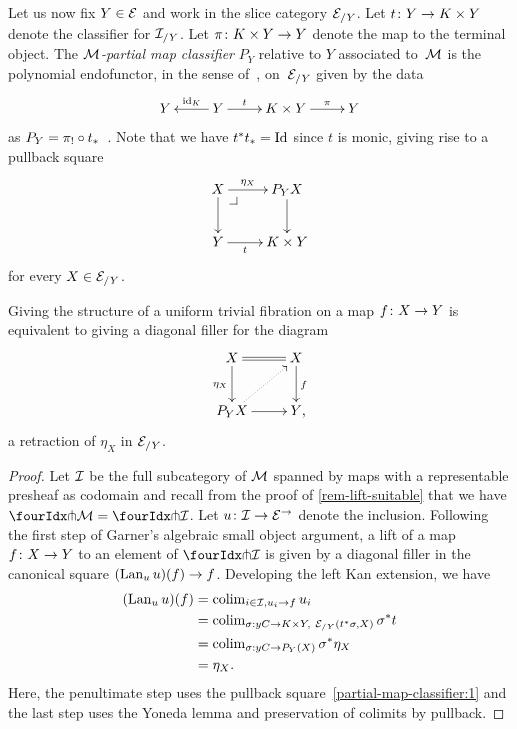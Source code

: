 \documentclass[reqno,10pt,a4paper,oneside,draft]{amsart}
\begin{document}
{{Let us now fix $Y \in \cal{E}$ and work in the slice category $\cal{E}_{/Y}$.
Let $t \co Y \to K \times Y$ denote the classifier for $\cal{I}_{/Y}$.
Let $\pi \co K \times Y \to Y$ denote the map to the terminal object.
The \emph{$\cal{M}$-partial map classifier} $P_Y$ relative to $Y$ associated to~$\cal{M}$ is the polynomial endofunctor, in the sense of~\cite{gambino-kock}, on~$\cal{E}_{/Y}$ given by the data
\[
\xymatrix{
  Y
&
  Y
  \ar[l]_-{\id_K}
  \ar[r]^-{t}
&
  K \times Y
  \ar[r]^-{\pi}
&
  Y
}
\]
as $P_Y = \pi_! \cc t_*$~\cite[A2.4]{johnstone:elephant}.
Note that we have $t^* t_* = \Id$ since $t$ is monic, giving rise to a pullback square
\begin{equation} \label{partial-map-classifier:1}
\begin{gathered}
\xymatrix{
  X
  \ar[r]^-{\eta_X}
  \ar[d]
  \pullback{dr}
&
  P_Y X
  \ar[d]
\\
  Y
  \ar[r]_-{t}
&
  K \times Y
}
\end{gathered}
\end{equation}
for every $X \in \cal{E}_{/Y}$.



\begin{theorem} \label{thm:part-map-classifier}
Giving the structure of a uniform trivial fibration on a map $f \co X \to Y$ is equivalent to giving a diagonal filler for the diagram
\begin{equation*}
\begin{gathered}
\xymatrix{
  X
  \ar@{=}[r]
  \ar[d]_{\eta_X}
&
  X
  \ar[d]^{f}
\\
  P_Y X
  \ar[r]
  \ar@{.>}[ur]
&
  Y
\rlap{,}}
\end{gathered}
\end{equation*}
\ie a retraction of $\eta_X$ in $\cal{E}_{/Y}$.
\end{theorem}

\begin{proof}
Let $\cal{I}$ be the full subcategory of $\cal{M}$ spanned by maps with a representable presheaf as codomain
and recall from the proof of \cref{rem-lift-suitable} that we have $\liftr{\cal{M}} = \liftr{\cal{I}}$.
Let $u \co \cal{I} \to \cal{E}^\to$ denote the inclusion.
Following the first step of Garner's algebraic small object argument, a lift of a map $f \co X \to Y$ to an element of $\liftr{\cal{I}}$ is given by a diagonal filler in the canonical square $(\Lan_u u)(f) \to f$.
Developing the left Kan extension, we have
\begin{align*}
(\Lan_u u)(f)
&=
\colim_{i \in \cal{I}, u_i \to f} u_i
\\&=
\colim_{\sigma : y C \to K \times Y,\ \cal{E}_{/Y}(t^* \sigma, X)} \sigma^* t
\\&=
\colim_{\sigma : y C \to P_Y(X)} \sigma^* \eta_X
\\&=
\eta_X
.
\end{align*}
Here, the penultimate step uses the pullback square~\eqref{partial-map-classifier:1} and the last step uses the Yoneda lemma and preservation of colimits by pullback.
\end{proof}

}}
\end{document}
